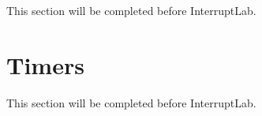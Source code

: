 \documentclass[12pt]{article}
\begin{document}
    This section will be completed before InterruptLab.

    \section{Timers} \label{sec:Timers}

    This section will be completed before InterruptLab.

%

    
\end{document}
